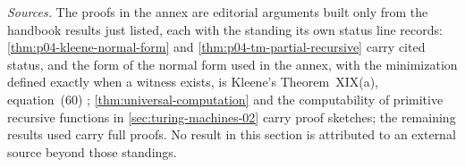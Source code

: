 \emph{Sources.}  The proofs in the annex are editorial arguments built
only from the handbook results just listed, each with the standing its
own status line records: \cref{thm:p04-kleene-normal-form} and
\cref{thm:p04-tm-partial-recursive} carry cited status, and the form of
the normal form used in the annex, with the minimization defined exactly
when a witness exists, is Kleene's Theorem~XIX(a), equation~(60)
\cite[\S\,63, p.~330]{Kleene1952};
\cref{thm:universal-computation} and the computability of primitive
recursive functions in \cref{sec:turing-machines-02} carry proof
sketches; the remaining results used carry full proofs.  No result in this section is attributed to an
external source beyond those standings.

